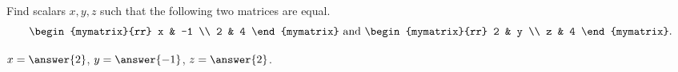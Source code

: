 \documentclass{ximera}
\author{Zack Reed}
\begin{document}
\begin{problem}
  Find scalars $x,y,z$ such that the following two matrices are equal.
  \begin{equation*}
    \begin{mymatrix}{rr}
      x & -1 \\
      2 & 4
    \end{mymatrix}
    \quad\mbox{and}\quad
    \begin{mymatrix}{rr}
      2 & y \\
      z & 4
    \end{mymatrix}.
  \end{equation*}
  \begin{sol}
    $x=\answer{2}$, $y=\answer{-1}$, $z=\answer{2}$.
  \end{sol}
\end{problem}
\end{document}

